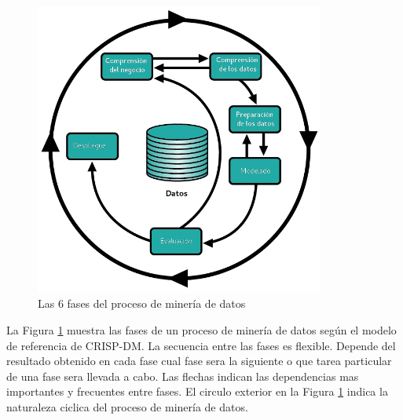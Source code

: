 \begin{figure}[H]
    \centering
    \includegraphics[width=0.85\textwidth]{Figuras/crip_fases.png}
    \caption{Las 6 fases del proceso de minería de datos}
    \label{fig:crispfases}
\end{figure} 


La Figura \ref{fig:crispfases} muestra las fases de un proceso de minería de datos según el modelo de referencia de CRISP-DM. La secuencia entre las fases es flexible. Depende del resultado obtenido en cada fase cual fase sera la siguiente o que tarea particular de una fase sera llevada a cabo. Las flechas indican las dependencias mas importantes y frecuentes entre fases. El circulo exterior en la Figura \ref{fig:crispfases} indica la naturaleza ciclica del proceso de minería de datos.\cite{chapman2000crisp}

